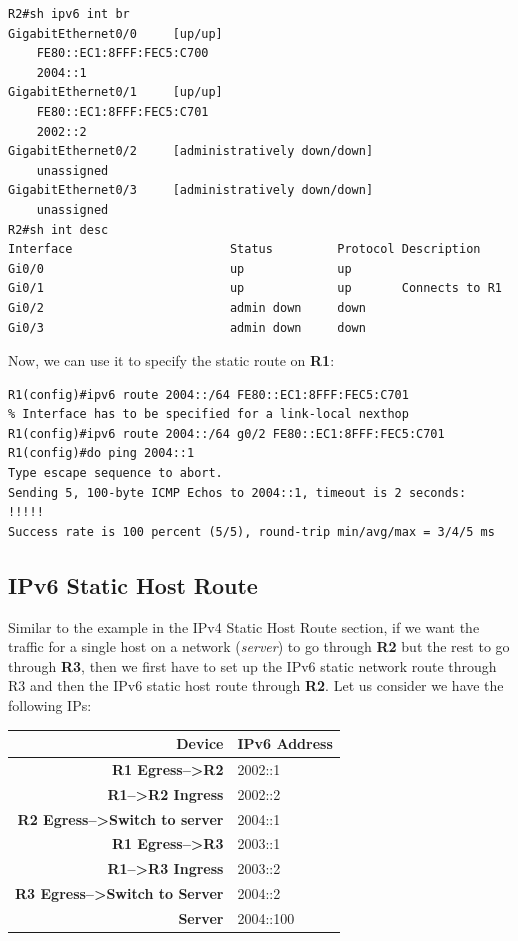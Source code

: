 \vspace{-15pt}
\begin{verbatim}
R2#sh ipv6 int br
GigabitEthernet0/0     [up/up]
    FE80::EC1:8FFF:FEC5:C700
    2004::1
GigabitEthernet0/1     [up/up]
    FE80::EC1:8FFF:FEC5:C701
    2002::2
GigabitEthernet0/2     [administratively down/down]
    unassigned
GigabitEthernet0/3     [administratively down/down]
    unassigned
R2#sh int desc
Interface                      Status         Protocol Description
Gi0/0                          up             up       
Gi0/1                          up             up       Connects to R1
Gi0/2                          admin down     down     
Gi0/3                          admin down     down     
\end{verbatim}
\vspace{-10pt}

\noindent
Now, we can use it to specify the static route on \textbf{R1}:

\vspace{-15pt}
\begin{verbatim}
R1(config)#ipv6 route 2004::/64 FE80::EC1:8FFF:FEC5:C701     
% Interface has to be specified for a link-local nexthop
R1(config)#ipv6 route 2004::/64 g0/2 FE80::EC1:8FFF:FEC5:C701
R1(config)#do ping 2004::1
Type escape sequence to abort.
Sending 5, 100-byte ICMP Echos to 2004::1, timeout is 2 seconds:
!!!!!
Success rate is 100 percent (5/5), round-trip min/avg/max = 3/4/5 ms
\end{verbatim}
\vspace{-10pt}

\subsection{IPv6 Static Host Route}
Similar to the example in the IPv4 Static Host Route section, if we want the traffic for a single host on a network (\textit{server}) to go through \textbf{R2} but the rest to go through \textbf{R3}, then we first have to set up the IPv6 static network route through R3 and then the IPv6 static host route through \textbf{R2}. Let us consider we have the following IPs: 

\vspace{-10pt}\noindent
\begin{center}
	\begin{tabular}{rl}
		\toprule
		\textbf{Device} &\textbf{IPv6 Address} \\
		\midrule
		\textbf{R1 Egress-->R2} 	&2002::1\\
		\textbf{R1-->R2 Ingress} 	&2002::2\\
		\textbf{R2 Egress-->Switch to server} &2004::1\\
		\textbf{R1 Egress-->R3} 	&2003::1\\
		\textbf{R1-->R3 Ingress} 	&2003::2\\
		\textbf{R3 Egress-->Switch to Server} &2004::2\\
		\textbf{Server} 			&2004::100\\
		\bottomrule
	\end{tabular}
\end{center}

